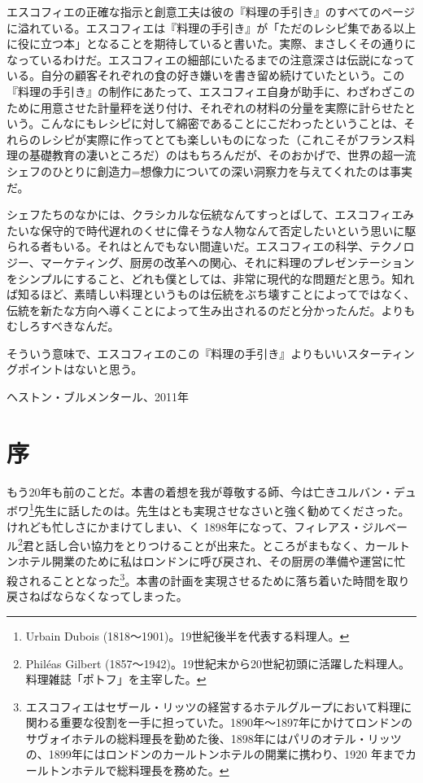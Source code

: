 \begin{Main}
エスコフィエの正確な指示と創意工夫は彼の『料理の手引き』のすべてのページに溢れている。エスコフィエは『料理の手引き』が「ただのレシピ集である以上に役に立つ本」となることを期待していると書いた。実際、まさしくその通りになっているわけだ。エスコフィエの細部にいたるまでの注意深さは伝説になっている。自分の顧客それぞれの食の好き嫌いを書き留め続けていたという。この『料理の手引き』の制作にあたって、エスコフィエ自身が助手に、わざわざこのために用意させた計量秤を送り付け、それぞれの材料の分量を実際に計らせたという。こんなにもレシピに対して綿密であることにこだわったということは、それらのレシピが実際に作ってとても楽しいものになった（これこそがフランス料理の基礎教育の凄いところだ）のはもちろんだが、そのおかげで、世界の超一流シェフのひとりに創造力=想像力についての深い洞察力を与えてくれたのは事実だ。

シェフたちのなかには、クラシカルな伝統なんてすっとばして、エスコフィエみたいな保守的で時代遅れのくせに偉そうな人物なんて否定したいという思いに駆られる者もいる。それはとんでもない間違いだ。エスコフィエの科学、テクノロジー、マーケティング、厨房の改革への関心、それに料理のプレゼンテーションをシンプルにすること、どれも僕としては、非常に現代的な問題だと思う。知れば知るほど、素晴しい料理というものは伝統をぶち壊すことによってではなく、伝統を新たな方向へ導くことによって生み出されるのだと分かったんだ。よりもむしろすべきなんだ。

そういう意味で、エスコフィエのこの『料理の手引き』よりもいいスターティングポイントはないと思う。

\begin{flushright}
ヘストン・ブルメンタール、2011年
\end{flushright}

\newpage

\hypertarget{avant-propos}{%
\chapter{序}\label{avant-propos}}

\fifteenq
{}

もう20年も前のことだ。本書の着想を我が尊敬する師、今は亡きユルバン・デュボワ\footnote{Urbain
  Dubois (1818〜1901)。19世紀後半を代表する料理人。}先生に話したのは。先生はとも実現させなさいと強く勧めてくださった。けれども忙しさにかまけてしまい、く
1898年になって、フィレアス・ジルベール\footnote{Philéas Gilbert
  (1857〜1942)。19世紀末から20世紀初頭に活躍した料理人。料理雑誌「ポトフ」を主宰した。}君と話し合い協力をとりつけることが出来た。ところがまもなく、カールトンホテル開業のために私はロンドンに呼び戻され、その厨房の準備や運営に忙殺されることとなった\footnote{エスコフィエはセザール・リッツの経営するホテルグループにおいて料理に関わる重要な役割を一手に担っていた。1890年〜1897年にかけてロンドンのサヴォイホテルの総料理長を勤めた後、1898年にはパリのオテル・リッツの、1899年にはロンドンのカールトンホテルの開業に携わり、1920
  年までカールトンホテルで総料理長を務めた。}。本書の計画を実現させるために落ち着いた時間を取り戻さねばならなくなってしまった。


\end{Main}
